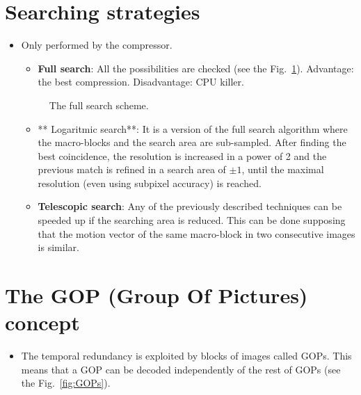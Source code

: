 \section{Searching strategies}
\begin{itemize}
\item
  Only performed by the compressor.

  \begin{itemize} \tightlist \item \textbf{Full search}: All the
  possibilities are checked (see the
  Fig.~\ref{fig:full_search}). Advantage: the best
  compression. Disadvantage: CPU killer.  \end{itemize}

  \begin{figure}
    \caption{The full search scheme.}
    \label{fig:full_search}
  \end{figure}
  
  \begin{itemize}
  \tightlist
  \item
    ** Logaritmic search**: It is a version of the full search algorithm
    where the macro-blocks and the search area are sub-sampled. After
    finding the best coincidence, the resolution is increased in a power
    of 2 and the previous match is refined in a search area of
    $\pm 1$, until the maximal resolution (even using subpixel
    accuracy) is reached.
  \end{itemize}

  \begin{itemize}
  \tightlist
  \item
    \textbf{Telescopic search}: Any of the previously described
    techniques can be speeded up if the searching area is reduced. This
    can be done supposing that the motion vector of the same macro-block
    in two consecutive images is similar.
  \end{itemize}
\end{itemize}

\section{The GOP (Group Of Pictures) concept}
\begin{itemize}
\tightlist
\item
  The temporal redundancy is exploited by blocks of images called GOPs.
  This means that a GOP can be decoded independently of the rest of
  GOPs (see the Fig.~\ref{fig:GOPs}).
\end{itemize}

